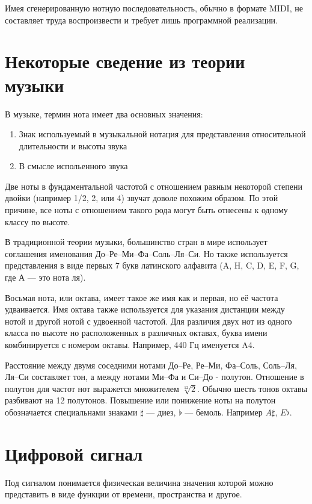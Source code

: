 \documentclass[oneside, final, 14pt]{extarticle}
\begin{document}
  Имея сгенерированную нотную последовательность, обычно в формате MIDI, не составляет
  труда воспроизвести и требует лишь программной реализации.
\cleardoublepage

\section{Некоторые сведение из теории музыки}

  В музыке, термин нота имеет два основных значения:

  \begin{enumerate}
    \item Знак используемый в музыкальной нотация для представления
      относительной длительности и высоты звука
    \item В смысле испольенного звука
  \end{enumerate}

  Две ноты в фундаментальной частотой с отношением равным некоторой
  степени двойки (например 1/2, 2, или 4) звучат доволе похожим
  образом. По этой причине, все ноты с отношением такого рода могут
  быть отнесены к одному классу по высоте.

  В традиционной теории музыки, большинство стран в мире использует
  соглашения именования До--Ре--Ми--Фа--Соль--Ля--Си. Но также используется
  представления в виде первых 7 букв латинского алфавита (A, H, C, D,
  E, F, G, где А --- это нота ля).

  Восьмая нота, или октава, имеет такое же имя как и первая, но её частота
  удваивается. Имя октава также используется для указания дистанции между
  нотой и другой нотой с удвоенной частотой. Для различия двух нот из одного
  класса по высоте но расположенных в различных октавах, буква имени
  комбинируется с номером октавы. Например, 440 Гц именуется A4.

  Расстояние между двумя соседними нотами До--Ре, Ре--Ми, Фа--Соль, Соль--Ля,
  Ля--Си составляет тон, а между нотами Ми--Фа и Си--До - полутон. Отношение
  в полутон для частот нот выражется множителем $\sqrt[12]{2}$. Обычно
  шесть тонов октавы разбивают на 12 полутонов. Повышение или понижение
  ноты на полутон обозначается специальнами знаками $\sharp$ --- диез,
  $\flat$ --- бемоль. Например $A\sharp$, $E\flat$.

\cleardoublepage
\section{Цифровой сигнал}
  Под сигналом понимается физическая величина значения которой можно представить в виде функции от времени, пространства
  и другое.
\end{document}
